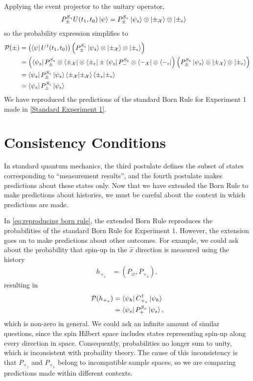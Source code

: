 Applying the event projector to the unitary operator,
\begin{align}
  P^{S_z}_\pm U(t_1, t_0) \ket{\psi} &= P^{S_z}_\pm \ket{\psi_s} \otimes \ket{\pm_\mathcal{X}} \otimes \ket{\pm_\epsilon}
\end{align}
so the probability expression simplifies to
\begin{align} \label{eq:reproducing born rule}
  \mathcal{P}(\pm) &= \left(\bra{\psi}  U^\dagger(t_1, t_0)\right) \left( P^{S_z}_\pm \ket{\psi_s} \otimes \ket{\pm_\mathcal{X}} \otimes \ket{\pm_\epsilon}\right) \\ \nonumber
   &= \left(\bra{\psi_s}P^{S_z}_\pm \otimes \bra{\pm_\mathcal{X}} \otimes \bra{\pm_\epsilon} \pm \bra{\psi_s}P^{S_z}_- \otimes \bra{-_\mathcal{X}} \otimes \bra{-_\epsilon} \right) \left( P^{S_z}_\pm \ket{\psi_s} \otimes \ket{\pm_\mathcal{X}} \otimes \ket{\pm_\epsilon}\right) \\ \nonumber
   &= \bra{\psi_s} P^{S_z}_\pm \ket{\psi_s} \braket{\pm_\mathcal{X}|\pm_\mathcal{X}} \braket{\pm_\epsilon|\pm_\epsilon} \\ \nonumber
   &= \bra{\psi_s} P^{S_z}_\pm \ket{\psi_s}
\end{align}
We have reproduced the predictions of the standard Born Rule for Experiment 1 made in \autoref{Standard Experiment 1}.

\section{Consistency Conditions}

In standard quantum mechanics, the third postulate defines the subset of states corresponding to ``measurement results'', and the fourth postulate makes predictions about these states only. Now that we have extended the Born Rule to make predictions about histories, we must be careful about the context in which predictions are made.

In \autoref{eq:reproducing born rule}, the extended Born Rule reproduces the probabilities of the standard Born Rule for Experiment 1. However, the extension goes on to make predictions about other outcomes. For example, we could ask about the probability that spin-up in the $\hat{x}$ direction is measured using the history
\begin{align}
  h_{+_x} &= (P_\varnothing ,P_{+_x}),
\end{align}
resulting in
\begin{align}
  \mathcal{P}(h_{+_x}) &= \bra{\psi_h} C^\dagger_{+_x} \ket{\psi_h}  \\ \nonumber
  &= \bra{\psi_s} P^{S_x}_+ \ket{\psi_s},
\end{align}
which is non-zero in general. We could ask an infinite amount of similar questions, since the spin Hilbert space includes states representing spin-up along every direction in space. Consequently, probabilities no longer sum to unity, which is inconsistent with probaility theory. The cause of this inconsistency is that $P_{+_z}$ and $P_{+_x}$ belong to incompatible sample spaces, so we are comparing predictions made within different contexts.

